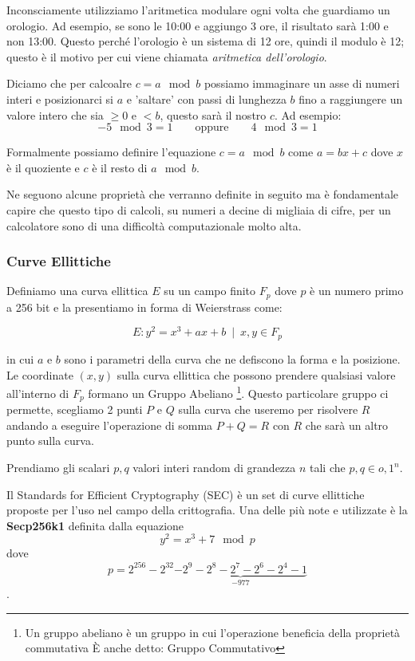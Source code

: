 \documentclass[12pt,a4paper]{article}
\begin{document}
Inconsciamente utilizziamo l'aritmetica modulare ogni volta che guardiamo un
orologio. Ad esempio, se sono le 10:00 e aggiungo 3 ore, il risultato sarà 1:00
e non 13:00. Questo perché l'orologio è un sistema di 12 ore, quindi il modulo è
12; questo è il motivo per cui viene chiamata \textit{aritmetica dell'orologio}.

Diciamo che per calcoalre $ c = a \mod{b} $ possiamo immaginare un asse di
numeri interi e posizionarci si $ a $ e 'saltare' con passi di lunghezza $ b $
fino a raggiungere un valore intero che sia $ \ge 0 $ e $ < b $, questo sarà il
nostro $ c $. Ad esempio:
$$ -5 \mod{3} = 1 \qquad \text{oppure} \qquad 4 \mod 3 = 1 $$

Formalmente possiamo definire l'equazione $ c = a \mod{b} $ come $ a = bx + c $
dove $ x $ è il quoziente e $ c $ è il resto di $ a \mod b $.

Ne seguono alcune proprietà che verranno definite in seguito ma è fondamentale capire che questo tipo di calcoli, su numeri a decine di migliaia di cifre, per un calcolatore sono di una difficoltà computazionale molto alta.

\subsubsection*{Curve Ellittiche}
Definiamo una curva ellittica $ E $ su un campo finito $ F_p $ dove $ p $ è un
numero primo a 256 bit e la presentiamo in forma di Weierstrass come:

$$ E: y^2 = x^3 + ax + b \enspace | \enspace x, y \in F_p $$

in cui $ a $ e $ b $ sono i parametri della curva che ne defiscono la forma e la
posizione. Le coordinate $ (x,y) $ sulla curva ellittica che possono prendere
qualsiasi valore all'interno di $F_p$ formano un Gruppo Abeliano \footnote{Un
gruppo abeliano è un gruppo in cui l'operazione beneficia della proprietà
commutativa È anche detto: Gruppo Commutativo}. Questo particolare gruppo ci
permette, scegliamo 2 punti $ P $ e $ Q $ sulla curva che useremo per risolvere
$ R $ andando a eseguire l'operazione di somma $ P + Q = R $ con $ R $ che sarà
un altro punto sulla curva.

Prendiamo gli scalari $p, q$ valori interi random di grandezza $n$ tali che $ p,
q \in {o,1}^n $.

Il Standards for Efficient Cryptography (SEC) è un set di curve ellittiche
proposte per l'uso nel campo della crittografia. Una delle più note e utilizzate
è la \textbf{Secp256k1} definita dalla equazione
$$ y^2 = x^3 + 7 \mod{p} $$ dove 
$$ p = 2^{256} - 2^{32} \underbrace{- 2^9 - 2^8 - 2^7 - 2^6 - 2^4 - 1}_{-977}
$$.
\end{document}
